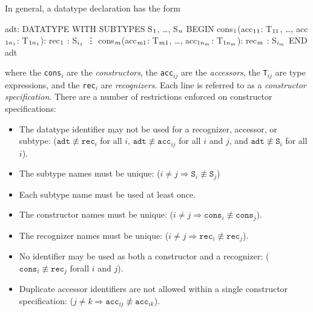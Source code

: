 In general, a datatype declaration has the form
\begin{pvsex}
  adt: DATATYPE WITH SUBTYPES S\(\sb{1}\), \ldots, S\(\sb{n}\)
    BEGIN
     cons\(\sb1\)(acc\(\sb{11}\): T\(\sb{11}\), \ldots, acc\(\sb{1{n\sb1}}\): T\(\sb{1{n\sb1}}\)): rec\(\sb1\) : S\(\sb{i\sb{1}}\)
     \vdots
     cons\(\sb{m}\)(acc\(\sb{m1}\): T\(\sb{m1}\), \ldots, acc\(\sb{1n\sb{m}}\): T\(\sb{1n\sb{m}}\)): rec\(\sb{m}\) : S\(\sb{i\sb{m}}\)
    END adt
\end{pvsex}
%
where the \texttt{cons$_i$} are the
\emph{constructors}, the
\texttt{acc$_{ij}$} are the
\emph{accessors}, the
\texttt{T$_{ij}$} are type expressions, and the \texttt{rec$_i$} are
\emph{recognizers}.  Each
line is referred to as a \emph{constructor
specification}.  There are a number of restrictions enforced on
constructor specifications:
\begin{itemize}

\item The datatype identifier may not be used for a recognizer,
accessor, or subtype:\newline
($\texttt{adt} \not\equiv \texttt{rec}_i$ for all $i$, $\texttt{adt}
\not\equiv \texttt{acc}_{ij}$ for all $i$ and $j$, and $\texttt{adt}
\not\equiv \texttt{S}_i$ for all $i$).

\item The subtype names must be unique:
($i \neq j \Rightarrow \texttt{S}_i \not\equiv \texttt{S}_j$)

\item Each subtype name must be used at least once.

\item The constructor names must be unique:
($i \neq j \Rightarrow \texttt{cons}_i \not\equiv \texttt{cons}_j$).

\item The recognizer names must be unique:
($i \neq j \Rightarrow \texttt{rec}_i \not\equiv \texttt{rec}_j$).

\item No identifier may be used as both a constructor and a recognizer:\newline
($\texttt{cons}_i \not\equiv \texttt{rec}_j$ forall $i$ and $j$).

\item Duplicate accessor identifiers are not allowed within a single
constructor specification:
($j \neq k \Rightarrow \texttt{acc}_{ij} \not\equiv \texttt{acc}_{ik}$).

\end{itemize}

